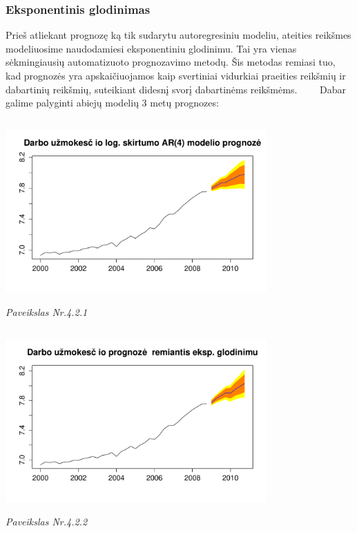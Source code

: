 \documentclass[12pt,a4paper]{article}
\theoremstyle{change}\newtheorem{salyga}{Uždavinys}
\begin{document}
     
     
     
     
     
\subsubsection{Eksponentinis glodinimas} 
\hspace{40pt}Prieš atliekant prognozę ką tik sudarytu autoregresiniu modeliu, ateities reikšmes modeliuosime naudodamiesi eksponentiniu glodinimu. Tai yra vienas sėkmingiausių automatizuoto prognozavimo metodų. Šis metodas remiasi tuo, kad prognozės yra apskaičiuojamos kaip svertiniai vidurkiai praeities reikšmių ir dabartinių reikšmių, suteikiant didesnį svorį dabartinėms reikšmėms. 
\vskip 8pt  
$\qquad$Dabar galime palyginti abiejų modelių 3 metų prognozes: 

\begin{center}
\includegraphics[width=100mm,height=70mm]{farlwage7}
\\ \textit{Paveikslas Nr.4.2.1}
\end{center}

\begin{center}
\includegraphics[width=100mm,height=70mm]{fexp}
\\ \textit{Paveikslas Nr.4.2.2}
\end{center}     
\end{document}
